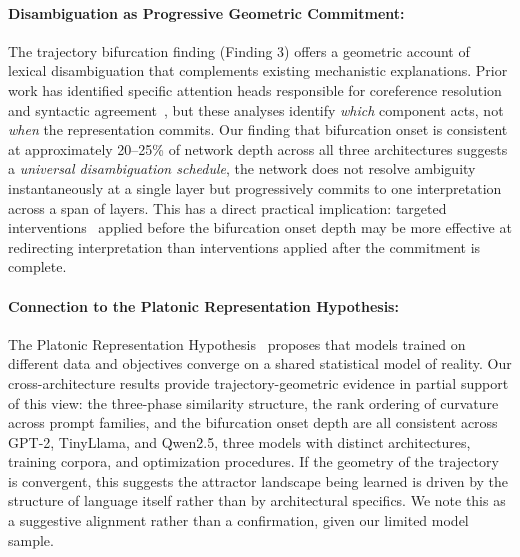 \documentclass{article}
\begin{document}
\paragraph{Disambiguation as Progressive Geometric Commitment:} The trajectory bifurcation finding (Finding 3) offers a geometric account of lexical disambiguation that complements existing mechanistic explanations. Prior work has identified specific attention heads responsible for coreference resolution~\cite{tenney2019bert} and syntactic agreement~\cite{jawahar2019bert}, but these analyses identify \textit{which} component acts, not \textit{when} the representation commits. Our finding that bifurcation onset is consistent at approximately 20--25\% of network depth across all three architectures suggests a \textit{universal disambiguation schedule}, the network does not resolve ambiguity instantaneously at a single layer but progressively commits to one interpretation across a span of layers. This has a direct practical implication: targeted interventions~\cite{meng2022locating} applied before the bifurcation onset depth may be more effective at redirecting interpretation than interventions applied after the commitment is complete.

\paragraph{Connection to the Platonic Representation Hypothesis:} The Platonic Representation Hypothesis~\cite{huh2024platonic} proposes that models trained on different data and objectives converge on a shared statistical model of reality. Our cross-architecture results provide trajectory-geometric evidence in partial support of this view: the three-phase similarity structure, the rank ordering of curvature across prompt families, and the bifurcation onset depth are all consistent across GPT-2, TinyLlama, and Qwen2.5, three models with distinct architectures, training corpora, and optimization procedures. If the geometry of the trajectory is convergent, this suggests the attractor landscape being learned is driven by the structure of language itself rather than by architectural specifics. We note this as a suggestive alignment rather than a confirmation, given our limited model sample.

\end{document}
